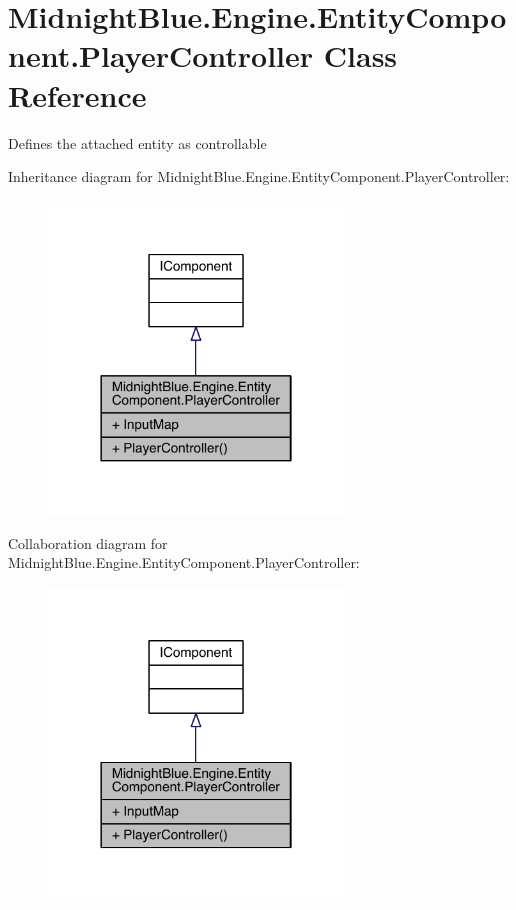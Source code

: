 \hypertarget{class_midnight_blue_1_1_engine_1_1_entity_component_1_1_player_controller}{}\section{Midnight\+Blue.\+Engine.\+Entity\+Component.\+Player\+Controller Class Reference}
\label{class_midnight_blue_1_1_engine_1_1_entity_component_1_1_player_controller}


Defines the attached entity as controllable  




Inheritance diagram for Midnight\+Blue.\+Engine.\+Entity\+Component.\+Player\+Controller\+:
\nopagebreak
\begin{figure}[H]
\begin{center}
\leavevmode
\includegraphics[width=222pt]{class_midnight_blue_1_1_engine_1_1_entity_component_1_1_player_controller__inherit__graph}
\end{center}
\end{figure}


Collaboration diagram for Midnight\+Blue.\+Engine.\+Entity\+Component.\+Player\+Controller\+:
\nopagebreak
\begin{figure}[H]
\begin{center}
\leavevmode
\includegraphics[width=222pt]{class_midnight_blue_1_1_engine_1_1_entity_component_1_1_player_controller__coll__graph}
\end{center}
\end{figure}
